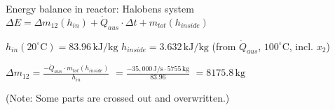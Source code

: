 Energy balance in reactor: Halobens system  
\( \Delta E = \Delta m_{12} (h_{in}) + \dot{Q}_{aus} \cdot \Delta t + m_{tot} (h_{inside}) \)  

\( h_{in} (20^\circ \text{C}) = 83.96 \, \text{kJ/kg} \)  
\( h_{inside} = 3.632 \, \text{kJ/kg} \) (from \( \dot{Q}_{aus} \), \( 100^\circ \text{C} \), incl. \( x_2 \))  

\( \Delta m_{12} = \frac{-\dot{Q}_{aus} \cdot m_{tot} (h_{inside})}{h_{in}} \)  
\( = \frac{-35,000 \, \text{J/s} \cdot 5755 \, \text{kg}}{83.96} \)  
\( = 8175.8 \, \text{kg} \)  

(Note: Some parts are crossed out and overwritten.)